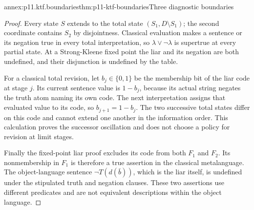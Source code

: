 \begin{annexitem}{annex:p11.ktf.boundaries}{thm:p11-ktf-boundaries}{Three diagnostic boundaries}
\begin{proof}
Every state \(S\) extends to the total state
\((S_1,D\setminus S_1)\); the second coordinate contains \(S_2\)
by disjointness. Classical evaluation makes a sentence or its negation
true in every total interpretation, so \(\lambda\lor\neg\lambda\)
is supertrue at every partial state. At a Strong-Kleene fixed point
the liar and its negation are both undefined, and their disjunction is
undefined by the table.

For a classical total revision, let \(b_j\in\{0,1\}\) be the
membership bit of the liar code at stage \(j\). Its current sentence
value is \(1-b_j\), because its actual string negates the truth
atom naming its own code. The next interpretation assigns that evaluated
value to its code, so \(b_{j+1}=1-b_j\). The two successive total
states differ on this code and cannot extend one another in the information
order. This calculation proves the successor oscillation and does not
choose a policy for revision at limit stages.

Finally the fixed-point liar proof excludes its code from both
\(F_1\) and \(F_2\). Its nonmembership in \(F_1\) is therefore
a true assertion in the classical metalanguage. The object-language
sentence \(\neg T(d(\bar b))\), which is the liar itself, is
undefined under the stipulated truth and negation clauses. These two
assertions use different predicates and are not equivalent descriptions
within the object language.
\end{proof}
\end{annexitem}

